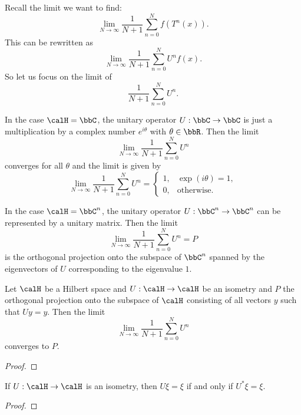     Recall the limit we want to find:
    \[ \lim_{N \to \infty} \frac{1}{N+1} \sum_{n=0}^{N} f(T^n(x)). \]
    This can be rewritten as
    \[ \lim_{N \to \infty} \frac{1}{N+1} \sum_{n=0}^{N} U^n f(x). \]
    So let us focus on the limit of
    \[ \frac{1}{N+1} \sum_{n=0}^{N} U^n. \]

    In the case \(\calH = \bbC\), the unitary operator \(U: \bbC \to \bbC\) is just a multiplication by a complex number \(e^{i\theta}\) with \(\theta \in \bbR\).
    Then the limit
    \[ \lim_{N \to \infty} \frac{1}{N+1} \sum_{n=0}^{N} U^n \]
    converges for all \(\theta\) and the limit is given by
    \[ \lim_{N \to \infty} \frac{1}{N+1} \sum_{n=0}^{N} U^n = \begin{cases}
        1, & \exp(i\theta) = 1, \\
        0, & \text{otherwise}.
    \end{cases} \]

    In the case \(\calH = \bbC^n\), the unitary operator \(U: \bbC^n \to \bbC^n\) can be represented by a unitary matrix.
    Then the limit
    \[ \lim_{N \to \infty} \frac{1}{N+1} \sum_{n=0}^{N} U^n = P\]
    is the orthogonal projection onto the subspace of \(\bbC^n\) spanned by the eigenvectors of \(U\) corresponding to the eigenvalue \(1\).

    \begin{theorem}\label{thm:von_neumann_mean_ergodic_theorem}
        Let \(\calH\) be a Hilbert space and \(U: \calH \to \calH\) be an isometry and \(P\) the orthogonal projection onto the subspace of \(\calH\) consisting of all vectors \(y\) such that \(U y = y\).
        Then the limit
        \[ \lim_{N \to \infty} \frac{1}{N+1} \sum_{n=0}^{N} U^n\]
        converges to \(P\).
    \end{theorem}
    \begin{proof}
    \end{proof}

    \begin{lemma}\label{lem:U_xi_equals_xi_iff_U_star_xi_equals_xi}
        If \(U: \calH \to \calH\) is an isometry, then \(U \xi = \xi\) if and only if \(U^* \xi = \xi\).
    \end{lemma}
    \begin{proof}
    \end{proof}

